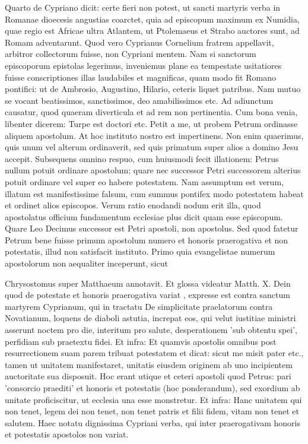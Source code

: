 Quarto de Cypriano dicit: certe fieri non potest, ut sancti martyris verba in Romanae dioecesis angustias coarctet, quia ad episcopum maximum ex Numidia, quae regio est Africae ultra Atlantem, ut Ptolemaeus et Strabo auctores sunt, ad Romam adventarunt. Quod vero Cyprianus Cornelium fratrem appellavit, arbitror collectorum fuisse, non Cypriani mentem. Nam si sanctorum episcoporum epistolas legerimus, inveniemus plane ea tempestate usitatiores fuisse conscriptiones illas laudabiles et magnificas, quam modo fit Romano pontifici: ut de Ambrosio, Augustino, Hilario, ceteris liquet patribus. Nam mutuo se vocant beatissimos, sanctissimos, deo amabilissimos etc. Ad adiunctum causatur, quod quaeram diverticula et ad rem non pertinentia. Cum bona venia, libenter dicerem: Turpe est doctori etc. Petit a me, ut probem Petrum ordinasse aliquem apostolum. At hoc instituto nostro est impertinens. Non enim quaerimus, quis unum vel alterum ordinaverit, sed quis primatum super alios a domino Jesu accepit. Subsequens omnino respuo, cum huiusmodi fecit illationem: Petrus nullum potuit ordinare apostolum; quare nec successor Petri successorem alterius potuit ordinare vel super eo habere potestatem. Nam assumptum est verum, illatum est manifestissime falsum, cum summus pontifex modo potestatem habeat et ordinet alios episcopos. Verum ratio enodandi nodum erit illa, quod apostolatus officium fundamentum ecclesiae plus dicit quam esse episcopum. Quare Leo Decimus successor est Petri apostoli, non apostolus. Sed quod fatetur Petrum bene fuisse primum apostolum numero et honoris praerogativa et non potestatis, illud non satisfacit instituto. Primo quia evangelistae numerum apostolorum non aequaliter inceperunt, sicut

Chrysostomus super Matthaeum annotavit. Et glossa videatur Matth. X. Dein quod de potestate et honoris praerogativa variat \marginpar{\small[269]}, expresse est contra sanctum martyrem Cyprianum, qui in tractatu De simplicitate praelatorum contra Novatianum, loquens de diaboli astutia, increpat eos, qui velut iustitiae ministri asserunt noctem pro die, interitum pro salute, desperationem 'sub obtentu spei', perfidiam sub praetextu fidei. Et infra: Et quamvis apostolis omnibus post resurrectionem suam parem tribuat potestatem et dicat: sicut me misit pater etc., tamen ut unitatem manifestaret, unitatis eiusdem originem ab uno incipientem auctoritate sua disposuit. Hoc erant utique et ceteri apostoli quod Petrus: pari 'consorcio praediti' et honoris et potestatis (hoc ponderandum), sed exordium ab unitate proficiscitur, ut ecclesia una esse monstretur. Et infra: Hanc unitatem qui non tenet, legem dei non tenet, non tenet patris et filii fidem, vitam non tenet et salutem. Haec notatu dignissima Cypriani verba, qui inter praerogativam honoris et potestatis apostolos non variat.

